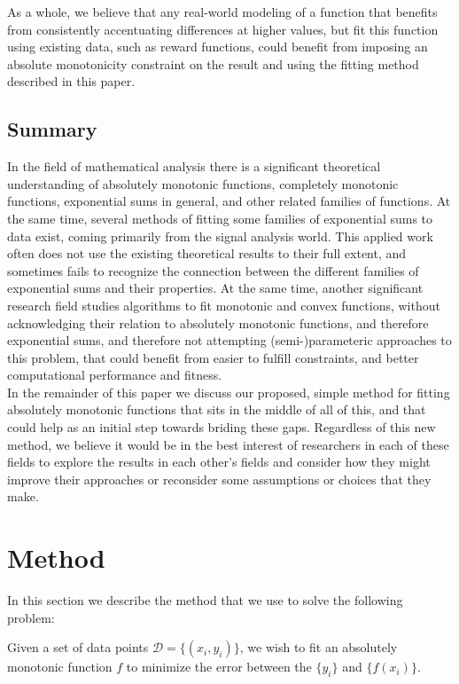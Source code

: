 \documentclass[12pt,a4paper]{article}
\begin{document}
As a whole, we believe that any real-world modeling of a function that benefits from consistently accentuating differences at higher values, but fit this function using existing data, such as reward functions, could benefit from imposing an absolute monotonicity constraint on the result and using the fitting method described in this paper.

\subsection{Summary}

In the field of mathematical analysis there is a significant theoretical understanding of absolutely monotonic functions, completely monotonic functions, exponential sums in general, and other related families of functions. At the same time, several methods of fitting some families of exponential sums to data exist, coming primarily from the signal analysis world. This applied work often does not use the existing theoretical results to their full extent, and sometimes fails to recognize the connection between the different families of exponential sums and their properties. At the same time, another significant research field studies algorithms to fit monotonic and convex functions, without acknowledging their relation to absolutely monotonic functions, and therefore exponential sums, and therefore not attempting (semi-)parameteric approaches to this problem, that could benefit from easier to fulfill constraints, and better computational performance and fitness.\\

In the remainder of this paper we discuss our proposed, simple method for fitting absolutely monotonic functions that sits in the middle of all of this, and that could help as an initial step towards briding these gaps. Regardless of this new method, we believe it would be in the best interest of researchers in each of these fields to explore the results in each other's fields and consider how they might improve their approaches or reconsider some assumptions or choices that they make.

\section{Method}
\label{method}

In this section we describe the method that we use to solve the following problem:

\begin{problem}
Given a set of data points $\mathcal{D} = \{(x_i,y_i)\}$, we wish to fit an absolutely monotonic function $f$ to minimize the error between the $\{y_i\}$ and $\{f(x_i)\}$.
\end{problem}
\end{document}
